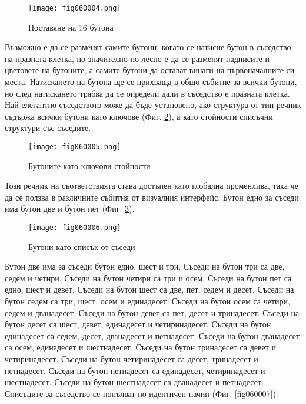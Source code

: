 \begin{figure}[H]
  \centering
  \texttt{[image: fig060004.png]}
  \caption{Поставяне на 16 бутона}
\label{fig060004}
\end{figure}

Възможно е да се разменят самите бутони, когато се натисне бутон в съседство на празната клетка, но значително по-лесно е да се разменят надписите и цветовете на бутоните, а самите бутони да остават винаги на първоначалните си места. Натискането на бутона ще се прихваща в общо събитие за всички бутони, но след натискането трябва да се определи дали в съседство е празната клетка. Най-елегантно съседството може да бъде установено, ако структура от тип речник съдържа всички бутони като ключове (Фиг. \ref{fig060005}), а като стойности списъчни структури със съседите.

\begin{figure}[H]
  \centering
  \texttt{[image: fig060005.png]}
  \caption{Бутоните като ключови стойности}
\label{fig060005}
\end{figure}

Този речник на съответствията става достъпен като глобална променлива, така че да се ползва в различните събития от визуалния интерфейс. Бутон едно за съседи има бутон две и бутон пет  (Фиг. \ref{fig060006}). 

\begin{figure}[H]
  \centering
  \texttt{[image: fig060006.png]}
  \caption{Бутони като списък от съседи}
\label{fig060006}
\end{figure}

Бутон две има за съседи бутон едно, шест и три. Съседи на бутон три са две, седем и четири. Съседи на бутон четири са три и осем. Съседи на бутон пет са едно, шест и девет. Съседи на бутон шест са две, пет, седем и десет. Съседи на бутон седем са три, шест, осем и единадесет. Съседи на бутон осем са четири, седем и дванадесет. Съседи на бутон девет са пет, десет и тринадесет. Съседи на бутон десет са шест, девет, единадесет и четиринадесет. Съседи на бутон единадесет са седем, десет, дванадесет и петнадесет. Съседи на бутон дванадесет са осем, единадесет и шестнадесет. Съседи на бутон тринадесет са девет и четиринадесет. Съседи на бутон четиринадесет са десет, тринадесет и петнадесет. Съседи на бутон петнадесет са единадесет, четиринадесет и шестнадесет. Съседи на бутон шестнадесет са дванадесет и петнадесет. Списъците за съседство се попълват по идентичен начин (Фиг. \ref{fig060007}).

